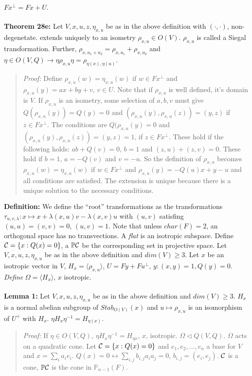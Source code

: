 $Fx^\perp = Fx + U$.
\\
\\
{\bf Theorem 28e:} Let $V, x, u, z, \eta_{x,u}$ be as in the above definition with $(\cdot, \cdot)$, non-degenetate.
extends uniquely to an isometry $\rho_{x, u} \in O(V)$. $\rho_{x, u}$ is called a Siegal transformation.
Further, 
$\rho_{x, u_1 + u_2} = \rho_{x,u_1} + \rho_{x,u_2}$ and 
$\eta \in O(V, Q) \rightarrow \eta \rho_{x,u} \eta= \rho_{\eta(x),  \eta(u)}$.
\begin{quote}
\emph{Proof:}  
Define $\rho_{x, u}(w) = \eta_{x,u}(w)$ if $w \in Fx^\perp$ and $\rho_{x, u}(y) = ax + by + v$, $v \in U$.
Note that if $\rho_{x, u}$ is well defined, it's domain is $V$.
If $\rho_{x, u}$ is an isometry, some selection of $a, b, v$ must give $Q(\rho_{x, u}(y)) = Q(y) = 0$ and
$(\rho_{x, u}(y), \rho_{x, u}(z)) = (y,z)$ if $z \in Fx^\perp$.  The conditions are $Q(\rho_{x,u}(y) =0$
and $(\rho_{x,u}(y), \rho_{x,u}(z)) = (y,z) = 1$, if $z \in Fx^\perp$.  These hold if the following holds:
$ab + Q(v) = 0$, $b = 1$ and $(z,u) + (z, v) = 0$.  These hold if $b = 1$, $a = -Q(v)$ and $v = -u$.  So the
definition of $\rho_{x, u}$ becomes $\rho_{x, u}(w) = \eta_{x,u}(w)$ if $w \in Fx^\perp$ and
$\rho_{x, u}(y) = -Q(u)x + y - u$ and all conditions are satisfied.  The extension is unique because there is
a unique solution to the necessary conditions.
\end{quote}
{\bf Definition:} We define the
``root'' transformations as the
transformations $\tau_{u,v, \lambda}: x \mapsto x + \lambda (x,u) v - \lambda (x,v) u$ with
$(u, v)$ satisfing $(u,u)= (v,v) = 0$, $(u,v)=1$.  Note that unless $char(F) =2$, an
orthogonal space has no transvections. 
A \emph{flat} is an isotropic subspace.  Define ${\cal C}= \{x: Q(x)=0 \}$, a 
${\mathbb P} {\cal C}$ be the corresponding set in projective space.  
Let $V, x, u, z, \eta_{x,u}$ be as in the above definition and $dim(V) \ge 3$.
Let $x$ be an isotropic vector in $V$, $H_x=  \langle \rho_{x,u} \rangle $, $U= Fy + F u^{\perp}$,
$y: (x,y)=1, Q(y)=0$.  \emph{Define} $\Omega= \langle H_x \rangle $, $x$ isotropic.
\\
\\
{\bf Lemma 1:}
Let $V, x, u, z, \eta_{x,u}$ be as in the above definition and $dim(V) \ge 3$.
$H_x$ is a normal abelian subgroup of $Stab_{O(V)}(x)$ and
$u \mapsto \rho_{x,u}$ is an isomorphism of $U^+$ with $H_x$.  $\eta H_x \eta^{-1}= H_{\eta(x)}$.
\begin{quote}
\emph{Proof:}  
If $\eta \in O(V,Q)$, $\eta H_x \eta^{-1}=H_{\eta x}$, $x$, isotropic. 
$\Omega \lhd Q(V,Q)$.  $\Omega$ acts on a quadratic cone.  Let ${\cal C} = \{ x: Q(x)=0 \}$ and
$e_1 , e_2 , \ldots , e_n$ a base for $V$ and $x= \sum_i a_i e_i$.  
$Q(x)=0 \leftrightarrow \sum_{i,j} b_{i,j} a_i a_j =0$, $b_{i,j}= (e_i, e_j)$.
${\cal C}$ is a cone, ${\mathbb P}{\cal C}$ is the cone in ${\mathbb P}_{n-1}(F)$.
\end{quote}
